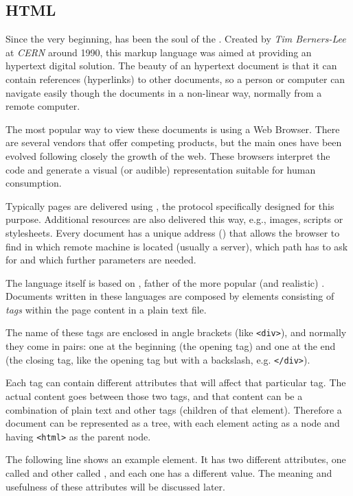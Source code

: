 \subsection{HTML} %
\label{sub:html}

Since the very beginning,  has been the soul of the .
Created by \emph{Tim Berners-Lee} at \emph{CERN} around 1990, this markup language was aimed at providing an hypertext digital solution.
The beauty of an hypertext document is that it can contain references (hyperlinks) to other documents, so a person or computer can navigate easily though the documents in a non-linear way, normally from a remote computer.

The most popular way to view these documents is using a Web Browser.
There are several vendors that offer competing products, but the main ones have been evolved following closely the growth of the web.
These browsers interpret the code and generate a visual (or audible) representation suitable for human consumption.

Typically  pages are delivered using , the protocol specifically designed for this purpose.
Additional resources are also delivered this way, e.g., images, scripts or stylesheets.
Every document has a unique address () that allows the browser to find in which remote machine is located (usually a server), which path has to ask for and which further parameters are needed.

The language itself is based on , father of the more popular (and realistic) .
Documents written in these languages are composed by elements consisting of \emph{tags} within the page content in a plain text file.

The name of these tags are enclosed in angle brackets (like \texttt{<div>}), and normally they come in pairs: one at the beginning (the opening tag) and one at the end (the closing tag, like the opening tag but with a backslash, e.g. \texttt{</div>}).

Each tag can contain different attributes that will affect that particular tag.
The actual content goes between those two tags, and that content can be a combination of plain text and other tags (children of that element).
Therefore a document can be represented as a tree, with each element acting as a node and having \texttt{<html>} as the parent node.

The following line shows an example element.
It has two different attributes, one called  and other called , and each one has a different value.
The meaning and usefulness of these attributes will be discussed later.

